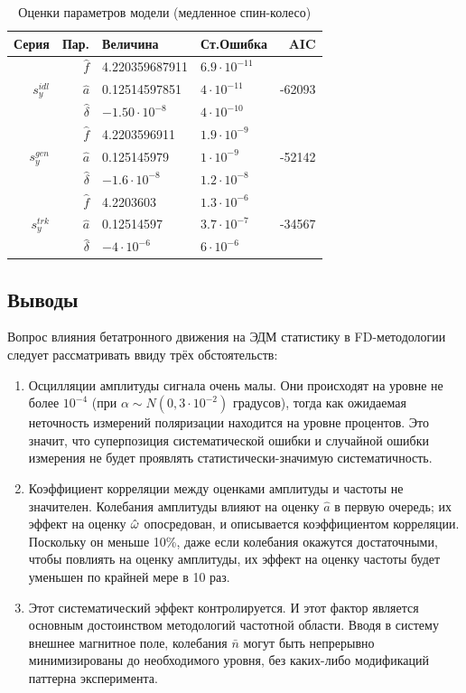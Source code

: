 \begin{table}[h]\centering
	\caption{Оценки параметров модели (медленное спин-колесо)\label{tbl:param_estimates}}
	\begin{tabular}{r|rllr}
		\toprule
		Серия & Пар. & Величина & Ст.Ошибка & AIC \\
		\midrule
		\multirow{3}{*}{$s_y^{idl}$}
		& $\hat f$ & 4.220359687911 & $6.9\cdot10^{-11}$ & \multirow{3}{*}{-62093} \\
		& $\hat a$ & 0.12514597851 & $4\cdot10^{-11}$ & \\
		& $\hat\delta$ & $-1.50\cdot10^{-8}$ & $4\cdot 10^{-10}$ &\\
		\hline
		\multirow{3}{*}{$s_y^{gen}$}
		& $\hat f$ & 4.2203596911 & $1.9\cdot 10^{-9}$ & \multirow{3}{*}{-52142} \\
		& $\hat a$ & 0.125145979 & $1\cdot 10^{-9}$ & \\
		& $\hat\delta$ & $-1.6\cdot 10^{-8}$ & $1.2\cdot 10^{-8}$ &\\
		\hline
		\multirow{3}{*}{$s_y^{trk}$}
		& $\hat f$ & 4.2203603 & $1.3\cdot 10^{-6}$ & \multirow{3}{*}{-34567} \\
		& $\hat a$ & 0.12514597 & $3.7\cdot10^{-7}$ & \\
		& $\hat\delta$ & $-4\cdot10^{-6}$ & $6\cdot 10^{-6}$ &\\
		\bottomrule
	\end{tabular}
\end{table}

\subsection{Выводы}
Вопрос влияния бетатронного движения на ЭДМ статистику в FD-методологии следует рассматривать
ввиду трёх обстоятельств:
\begin{enumerate}
\item Осцилляции амплитуды сигнала очень малы. Они происходят на уровне не более $10^{-4}$ (при
  $\alpha\sim N(0, 3\cdot 10^{-2})$ градусов), тогда как ожидаемая неточность измерений поляризации находится
  на уровне процентов. Это значит, что суперпозиция систематической ошибки и случайной ошибки измерения
  не будет проявлять статистически-значимую систематичность.
\item Коэффициент корреляции между оценками амплитуды и частоты не значителен. Колебания амплитуды
  влияют на оценку $\hat a$ в первую очередь; их эффект на оценку $\hat{\omega}$ опосредован, и описывается
  коэффициентом корреляции. Поскольку он меньше 10\%, даже если колебания окажутся достаточными, чтобы повлиять
  на оценку амплитуды, их эффект на оценку частоты будет уменьшен по крайней мере в 10 раз.
\item Этот систематический эффект контролируется. И этот фактор является основным достоинством методологий
  частотной области. Вводя в систему внешнее магнитное поле, колебания $\bar n$ могут быть 
  непрерывно минимизированы  до необходимого уровня, без каких-либо модификаций паттерна эксперимента.
\end{enumerate}
